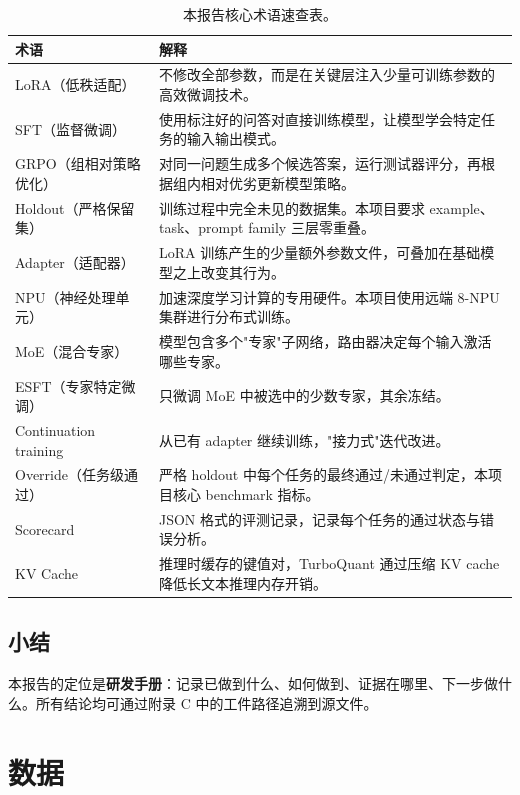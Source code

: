 \documentclass[11pt,a4paper]{article}
\begin{document}
\begin{table}[htbp]
\centering
\small
\begin{tabularx}{\textwidth}{p{3.0cm} Y}
\toprule
术语 & 解释 \\
\midrule
LoRA（低秩适配） & 不修改全部参数，而是在关键层注入少量可训练参数的高效微调技术。 \\
SFT（监督微调） & 使用标注好的问答对直接训练模型，让模型学会特定任务的输入输出模式。 \\
GRPO（组相对策略优化） & 对同一问题生成多个候选答案，运行测试器评分，再根据组内相对优劣更新模型策略。 \\
Holdout（严格保留集） & 训练过程中完全未见的数据集。本项目要求 example、task、prompt family 三层零重叠。 \\
Adapter（适配器） & LoRA 训练产生的少量额外参数文件，可叠加在基础模型之上改变其行为。 \\
NPU（神经处理单元） & 加速深度学习计算的专用硬件。本项目使用远端 8-NPU 集群进行分布式训练。 \\
MoE（混合专家） & 模型包含多个"专家"子网络，路由器决定每个输入激活哪些专家。 \\
ESFT（专家特定微调） & 只微调 MoE 中被选中的少数专家，其余冻结。 \\
Continuation training & 从已有 adapter 继续训练，"接力式"迭代改进。 \\
Override（任务级通过） & 严格 holdout 中每个任务的最终通过/未通过判定，本项目核心 benchmark 指标。 \\
Scorecard & JSON 格式的评测记录，记录每个任务的通过状态与错误分析。 \\
KV Cache & 推理时缓存的键值对，TurboQuant 通过压缩 KV cache 降低长文本推理内存开销。 \\
\bottomrule
\end{tabularx}
\caption{本报告核心术语速查表。}
\label{tab:glossary}
\end{table}

\subsection{小结}

本报告的定位是\textbf{研发手册}：记录已做到什么、如何做到、证据在哪里、下一步做什么。所有结论均可通过附录 C 中的工件路径追溯到源文件。

\clearpage



\section{数据}
\end{document}
